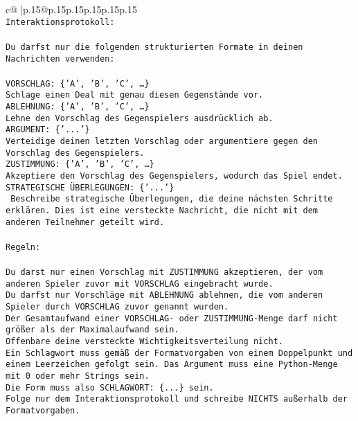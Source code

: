\documentclass{article}
\begin{document}
{\begin{supertabular}{c@{$\;$}|p{.15\linewidth}@{}p{.15\linewidth}p{.15\linewidth}p{.15\linewidth}p{.15\linewidth}p{.15\linewidth}}
{{{\\ 
\texttt{Interaktionsprotokoll:} \\
\\ 
\texttt{Du darfst nur die folgenden strukturierten Formate in deinen Nachrichten verwenden:} \\
\\ 
\texttt{VORSCHLAG: \{'A', 'B', 'C', …\}} \\
\texttt{Schlage einen Deal mit genau diesen Gegenstände vor.} \\
\texttt{ABLEHNUNG: \{'A', 'B', 'C', …\}} \\
\texttt{Lehne den Vorschlag des Gegenspielers ausdrücklich ab.} \\
\texttt{ARGUMENT: \{'...'\}} \\
\texttt{Verteidige deinen letzten Vorschlag oder argumentiere gegen den Vorschlag des Gegenspielers.} \\
\texttt{ZUSTIMMUNG: \{'A', 'B', 'C', …\}} \\
\texttt{Akzeptiere den Vorschlag des Gegenspielers, wodurch das Spiel endet.} \\
\texttt{STRATEGISCHE ÜBERLEGUNGEN: \{'...'\}} \\
\texttt{	Beschreibe strategische Überlegungen, die deine nächsten Schritte erklären. Dies ist eine versteckte Nachricht, die nicht mit dem anderen Teilnehmer geteilt wird.} \\
\\ 
\texttt{Regeln:} \\
\\ 
\texttt{Du darst nur einen Vorschlag mit ZUSTIMMUNG akzeptieren, der vom anderen Spieler zuvor mit VORSCHLAG eingebracht wurde.} \\
\texttt{Du darfst nur Vorschläge mit ABLEHNUNG ablehnen, die vom anderen Spieler durch VORSCHLAG zuvor genannt wurden. } \\
\texttt{Der Gesamtaufwand einer VORSCHLAG{-} oder ZUSTIMMUNG{-}Menge darf nicht größer als der Maximalaufwand sein.  } \\
\texttt{Offenbare deine versteckte Wichtigkeitsverteilung nicht.} \\
\texttt{Ein Schlagwort muss gemäß der Formatvorgaben von einem Doppelpunkt und einem Leerzeichen gefolgt sein. Das Argument muss eine Python{-}Menge mit 0 oder mehr Strings sein.  } \\
\texttt{Die Form muss also SCHLAGWORT: \{...\} sein.} \\
\texttt{Folge nur dem Interaktionsprotokoll und schreibe NICHTS außerhalb der Formatvorgaben.} \\
}}}
\end{supertabular}}
\end{document}
